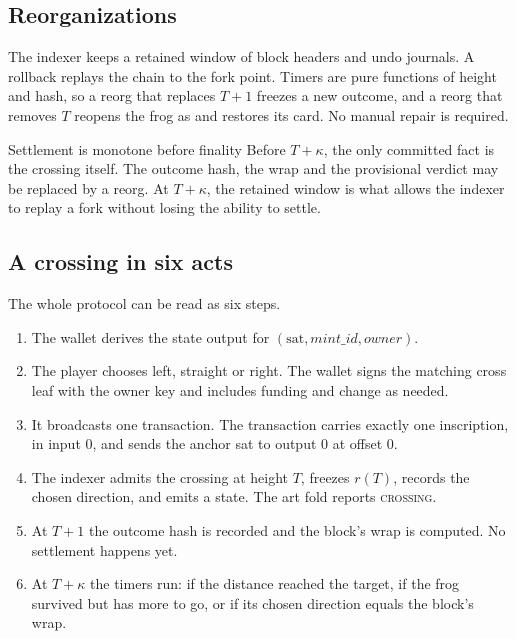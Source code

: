 \subsection{Reorganizations}

The indexer keeps a retained window of block headers and undo journals. A
rollback replays the chain to the fork point. Timers are pure functions of
height and hash, so a reorg that replaces $T+1$ freezes a new outcome, and a
reorg that removes $T$ reopens the frog as  and restores its card.
No manual repair is required.

\begin{invariant}{Settlement is monotone before finality}
Before $T+\kappa$, the only committed fact is the crossing itself. The
outcome hash, the wrap and the provisional verdict may be replaced by a
reorg. At $T+\kappa$, the retained window is what allows the indexer to
replay a fork without losing the ability to settle.
\end{invariant}

\subsection{A crossing in six acts}

The whole protocol can be read as six steps.

\begin{enumerate}[leftmargin=1.7em,itemsep=0.22em]
  \item The wallet derives the state output for
        $(\mathrm{sat},\mathit{mint\_id},\mathit{owner})$.
  \item The player chooses left, straight or right. The wallet signs the
        matching cross leaf with the owner key and includes funding and
        change as needed.
  \item It broadcasts one transaction. The transaction carries exactly one
        inscription, in input 0, and sends the anchor sat to output 0 at
        offset 0.
  \item The indexer admits the crossing at height $T$, freezes $r(T)$,
        records the chosen direction, and emits a  state. The
        art fold reports \textsc{crossing}.
  \item At $T+1$ the outcome hash is recorded and the block's wrap is
        computed. No settlement happens yet.
  \item At $T+\kappa$ the timers run:  if the distance reached the
        target,  if the frog survived but has more to go, or
         if its chosen direction equals the block's wrap.
\end{enumerate}

